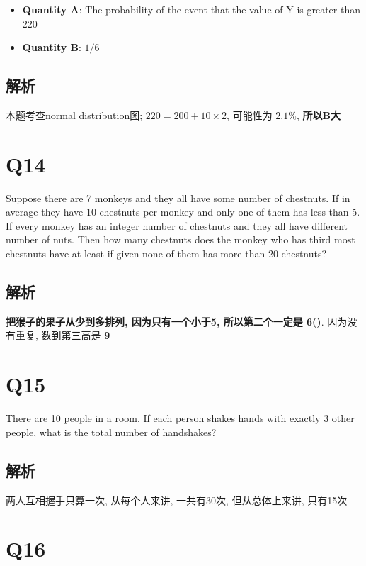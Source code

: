   \begin{itemize}
    \item \textbf{Quantity A}: The probability of the event that the value of Y
    is greater than 220
    \item \textbf{Quantity B}: $ 1/6 $
  \end{itemize}

  \subsection{解析}

    本题考查normal distribution图; $ 220 = 200 + 10 \times 2 $, 可能性为 $ 2.1\% $,
    \textbf{所以B大}

\section{Q14}

  Suppose there are 7 monkeys and they all have some number of chestnuts.
  If in average they have 10 chestnuts per monkey and only one of them has
  less than 5. If every monkey has an integer number of chestnuts and they all
  have different number of nuts. Then how many chestnuts does the monkey who
  has third most chestnuts have at least if given none of them has more than
  20 chestnuts?

  \subsection{解析}

    \textbf{把猴子的果子从少到多排列, 因为只有一个小于5, 所以第二个一定是
    6()}. 因为没有重复, 数到第三高是 \textbf{9}

\section{Q15}

  There are 10 people in a room. If each person shakes hands with exactly 3
  other people, what is the total number of handshakes?

  \subsection{解析}

    两人互相握手只算一次, 从每个人来讲, 一共有30次, 但从总体上来讲, 只有15次

\section{Q16}

